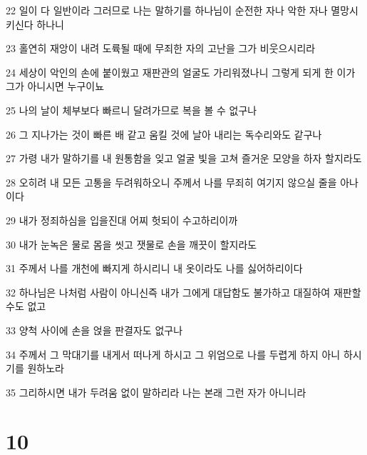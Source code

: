 \par 22 일이 다 일반이라 그러므로 나는 말하기를 하나님이 순전한 자나 악한 자나 멸망시키신다 하나니
\par 23 홀연히 재앙이 내려 도륙될 때에 무죄한 자의 고난을 그가 비웃으시리라
\par 24 세상이 악인의 손에 붙이웠고 재판관의 얼굴도 가리워졌나니 그렇게 되게 한 이가 그가 아니시면 누구이뇨
\par 25 나의 날이 체부보다 빠르니 달려가므로 복을 볼 수 없구나
\par 26 그 지나가는 것이 빠른 배 같고 움킬 것에 날아 내리는 독수리와도 같구나
\par 27 가령 내가 말하기를 내 원통함을 잊고 얼굴 빛을 고쳐 즐거운 모양을 하자 할지라도
\par 28 오히려 내 모든 고통을 두려워하오니 주께서 나를 무죄히 여기지 않으실 줄을 아나이다
\par 29 내가 정죄하심을 입을진대 어찌 헛되이 수고하리이까
\par 30 내가 눈녹은 물로 몸을 씻고 잿물로 손을 깨끗이 할지라도
\par 31 주께서 나를 개천에 빠지게 하시리니 내 옷이라도 나를 싫어하리이다
\par 32 하나님은 나처럼 사람이 아니신즉 내가 그에게 대답함도 불가하고 대질하여 재판할 수도 없고
\par 33 양척 사이에 손을 얹을 판결자도 없구나
\par 34 주께서 그 막대기를 내게서 떠나게 하시고 그 위엄으로 나를 두렵게 하지 아니 하시기를 원하노라
\par 35 그리하시면 내가 두려움 없이 말하리라 나는 본래 그런 자가 아니니라

\chapter{10}

